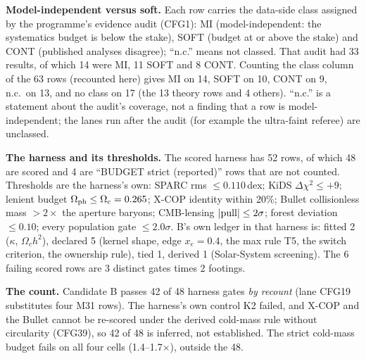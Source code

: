 \documentclass[10pt]{article}
\begin{document}
\textbf{Model-independent versus soft.} Each row carries the data-side class assigned by the programme's evidence audit (CFG1): MI (model-independent: the systematics budget is below the stake), SOFT (budget at or above the stake) and CONT (published analyses disagree); ``n.c.'' means not classed. That audit had 33 results, of which 14 were MI, 11 SOFT and 8 CONT. Counting the class column of the 63 rows (recounted here) gives MI on 14, SOFT on 10, CONT on 9, n.c.\ on 13, and no class on 17 (the 13 theory rows and 4 others). ``n.c.'' is a statement about the audit's coverage, not a finding that a row is model-independent; the lanes run after the audit (for example the ultra-faint referee) are unclassed.

\textbf{The harness and its thresholds.} The scored harness has 52 rows, of which 48 are scored and 4 are ``BUDGET strict (reported)'' rows that are not counted. Thresholds are the harness's own: SPARC rms $\le0.110$\,dex; KiDS $\Delta\chi^2\le+9$; lenient budget $\Omega_{\rm ph}\le\Omega_c=0.265$; X-COP identity within 20\%; Bullet collisionless mass $>2\times$ the aperture baryons; CMB-lensing $|{\rm pull}|\le2\sigma$; forest deviation $\le0.10$; every population gate $\le2.0\sigma$. B's own ledger in that harness is: fitted 2 ($\kappa$, $\Omega_ch^2$), declared 5 (kernel shape, edge $x_e=0.4$, the max rule T5, the switch criterion, the ownership rule), tied 1, derived 1 (Solar-System screening). The 6 failing scored rows are 3 distinct gates times 2 footings.

\textbf{The count.} Candidate B passes 42 of 48 harness gates \emph{by recount} (lane CFG19 substitutes four M31 rows). The harness's own control K2 failed, and X-COP and the Bullet cannot be re-scored under the derived cold-mass rule without circularity (CFG39), so 42 of 48 is inferred, not established. The strict cold-mass budget fails on all four cells (1.4--1.7$\times$), outside the 48.
\end{document}
